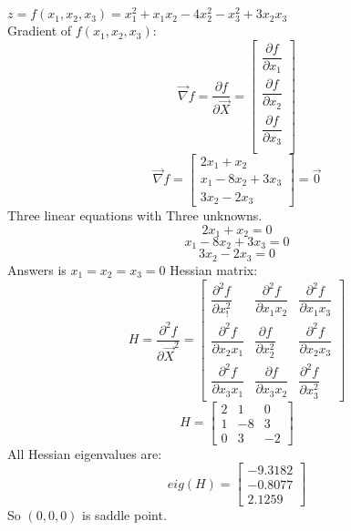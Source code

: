$z = f(x_1, x_2, x_3) = x_1^2 + x_1x_2 - 4x_2^2-x_3^2 + 3x_2x_3$ \\
Gradient of $f(x_1, x_2, x_3)$:
$$\vec{\nabla} f = \dfrac{\partial f}{\partial \vec{X}}= \begin{bmatrix}
	\dfrac{\partial f}{\partial x_1} \\[8pt]
	\dfrac{\partial f}{\partial x_2} \\[8pt]
	\dfrac{\partial f}{\partial x_3} \\
\end{bmatrix} $$
$$\vec{\nabla} f =   \begin{bmatrix}
	2x_1 + x_2 \\
	x_1 -8x_2 + 3x_3 \\
	3x_2 - 2x_3
\end{bmatrix}  = \vec{0}$$
Three linear equations with Three unknowns.
$$	2x_1 + x_2 = 0 $$
$$x_1 -8x_2 + 3x_3 = 0$$
$$3x_2 - 2x_3 = 0 $$
Answers is $x_1 = x_2 = x_3 = 0$
Hessian matrix:
$$H = \dfrac{\partial^2 f}{\partial \vec{X}^2} = \begin{bmatrix}
	\dfrac{\partial^2 f}{\partial x_!^2} & \dfrac{\partial^2 f}{\partial x_1x_2} & \dfrac{\partial^2 f}{\partial x_1x_3} \\[8pt]
	\dfrac{\partial^2 f}{\partial x_2x_1}  & \dfrac{\partial f}{\partial x_2^2} & \dfrac{\partial^2 f}{\partial x_2x_3}  \\[8pt]
		\dfrac{\partial^2 f}{\partial x_3x_1}  & \dfrac{\partial f}{\partial x_3x_2} & \dfrac{\partial^2 f}{\partial x_3^2} 
\end{bmatrix} $$
$$H = \begin{bmatrix}
	2 & 1 & 0 \\
	1 & -8 & 3 \\
	0 & 3 & -2
\end{bmatrix}$$
All Hessian eigenvalues are:
$$eig(H) = \begin{bmatrix}
	-9.3182  \\
	-0.8077 \\
	2.1259
\end{bmatrix}$$
So $(0, 0, 0)$ is saddle point.